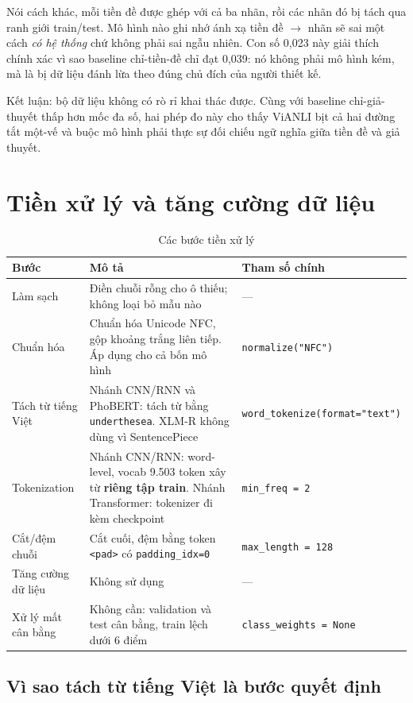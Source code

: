 \documentclass[12pt,a4paper,oneside]{report}
\begin{document}
Nói cách khác, mỗi tiền đề được ghép với cả ba nhãn, rồi các nhãn đó bị tách qua ranh giới
train/test. Mô hình nào ghi nhớ ánh xạ tiền đề $\rightarrow$ nhãn sẽ sai một cách
\textit{có hệ thống} chứ không phải sai ngẫu nhiên. Con số 0,023 này giải thích chính xác
vì sao baseline chỉ-tiền-đề chỉ đạt 0,039: nó không phải mô hình kém, mà là bị dữ liệu
đánh lừa theo đúng chủ đích của người thiết kế.

Kết luận: bộ dữ liệu không có rò rỉ khai thác được. Cùng với baseline chỉ-giả-thuyết thấp
hơn mốc đa số, hai phép đo này cho thấy ViANLI bịt cả hai đường tắt một-vế và buộc mô hình
phải thực sự đối chiếu ngữ nghĩa giữa tiền đề và giả thuyết.

\section{Tiền xử lý và tăng cường dữ liệu}

\begin{table}[H]
\centering
\small
\caption{Các bước tiền xử lý}
\begin{tabularx}{\textwidth}{@{}L{2.7cm}Y L{3.9cm}@{}}
\toprule
\textbf{Bước} & \textbf{Mô tả} & \textbf{Tham số chính} \\
\midrule
Làm sạch & Điền chuỗi rỗng cho ô thiếu; không loại bỏ mẫu nào &
  --- \\
Chuẩn hóa & Chuẩn hóa Unicode NFC, gộp khoảng trắng liên tiếp. Áp dụng cho cả bốn mô hình &
  \texttt{normalize(}\allowbreak\texttt{"NFC")} \\
Tách từ tiếng Việt & Nhánh CNN/RNN và PhoBERT: tách từ bằng \texttt{underthesea}.
  XLM-R không dùng vì SentencePiece &
  \texttt{word\_tokenize(}\allowbreak\texttt{format="text")} \\
Tokenization & Nhánh CNN/RNN: word-level, vocab 9.503 token xây từ \textbf{riêng tập
  train}. Nhánh Transformer: tokenizer đi kèm checkpoint &
  \texttt{min\_freq = 2} \\
Cắt/đệm chuỗi & Cắt cuối, đệm bằng token \texttt{<pad>} có \texttt{padding\_idx=0} &
  \texttt{max\_length = 128} \\
Tăng cường dữ liệu & Không sử dụng &
  --- \\
Xử lý mất cân bằng & Không cần: validation và test cân bằng, train lệch dưới 6 điểm &
  \texttt{class\_weights = None} \\
\bottomrule
\end{tabularx}
\end{table}

\subsection{Vì sao tách từ tiếng Việt là bước quyết định}
\end{document}
